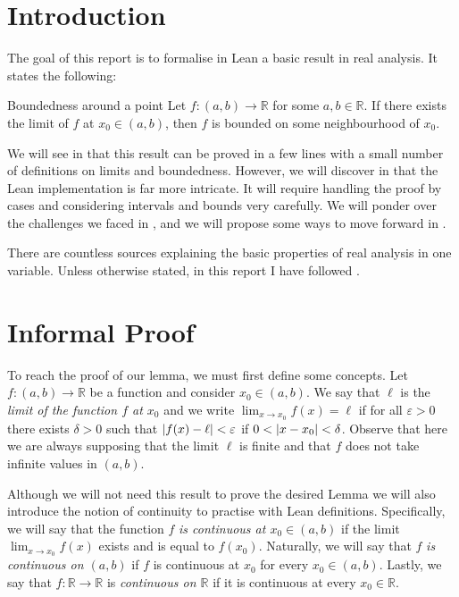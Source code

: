 \documentclass[a4paper,11pt]{article}
\theoremstyle{plain}
\newcommand{\R}{\ensuremath{\mathbb{R}}} %
\begin{document}
	\section{Introduction}
	
	The goal of this report is to formalise in Lean a basic result in real analysis. It states the following:\\
	
	\begin{lemma*}{Boundedness around a point}{}
			Let $f:(a,b)\rightarrow \R$ for some $a,b\in\R$. If there exists the limit of $f$ at $x_0\in(a,b)$, then $f$ is bounded on some neighbourhood of $x_0$.
	\end{lemma*}

	
	We will see in  that this result can be proved in a few lines with a small number of definitions on limits and boundedness. However, we will discover in  that the Lean implementation is far more intricate. It will require handling the proof by cases and considering intervals and bounds very carefully. We will ponder over the challenges we faced in , and we will propose some ways to move forward in .
	
	There are countless sources explaining the basic properties of real analysis in one variable. Unless otherwise stated, in this report I have followed \cite{manyosas}.

	\section{Informal Proof}\label{sec:informal}
	
	To reach the proof of our lemma, we must first define some concepts. Let $f: (a, b) \rightarrow \R$ be a function and consider $x_0\in(a, b)$. We say that $\ell$ is the \emph{limit of the function $f$ at $x_0$} and we write $\lim_{x\rightarrow x_0}f(x)=\ell$ if for all $\varepsilon>0$ there exists $\delta>0$ such that $\abs{f(x)-\ell}<\varepsilon$ if $0 < \abs{x-x_0} < \delta$. Observe that here we are always supposing that the limit $\ell$ is finite and that $f$ does not take infinite values in $(a,b)$.
	
	Although we will not need this result to prove the desired Lemma we will also introduce the notion of continuity to practise with Lean definitions. Specifically, we will say that the function $f$ \emph{is continuous at $x_0\in(a,b)$} if the limit $\lim_{x\rightarrow x_0}f(x)$ exists and is equal to $f(x_0)$. Naturally, we will say that $f$ \emph{is continuous on $(a,b)$} if $f$ is continuous at $x_0$ for every $x_0\in(a,b)$. Lastly, we say that $f:\R\rightarrow\R$ is \emph{continuous on $\R$} if it is continuous at every $x_0\in\R$.
	
\end{document}
